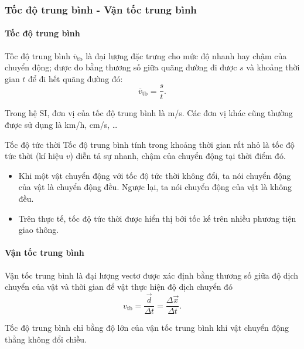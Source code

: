 \begin{tomtat}
	\subsubsection{Tốc độ trung bình - Vận tốc trung bình}
	\paragraph{Tốc độ trung bình}
	\begin{dn}
		Tốc độ trung bình $\overline{v}_{\text{tb}}$ là đại lượng đặc trưng cho mức độ nhanh hay chậm của chuyển động; được đo bằng thương số giữa quãng đường đi được $s$ và khoảng thời gian $t$ để đi hết quãng đường đó:
		\begin{equation}
			\overline{v}_{\text{tb}}=\dfrac{s}{t}.
		\end{equation}
	\end{dn}
	Trong hệ SI, đơn vị của tốc độ trung bình là \si{\meter/\second}. Các đơn vị khác cũng thường được sử dụng là \si{\kilo\meter/\hour}, \si{\centi\meter/\second}, \dots
	\begin{noidung}{Tốc độ tức thời}
		Tốc độ trung bình tính trong khoảng thời gian rất nhỏ là tốc độ tức thời (kí hiệu $v$) diễn tả sự nhanh, chậm của chuyển động tại thời điểm đó.
	\end{noidung}
	\begin{luuy}
		\begin{itemize}
			\item Khi một vật chuyển động với tốc độ tức thời không đổi, ta nói chuyển động của vật là chuyển động đều. Ngược lại, ta nói chuyển động của vật là không đều.
			\item Trên thực tế, tốc độ tức thời được hiển thị bởi tốc kế trên nhiều phương tiện giao thông.
		\end{itemize}
	\end{luuy}
	\paragraph{Vận tốc trung bình}
	\begin{dn}
		Vận tốc trung bình là đại lượng vectơ được xác định bằng thương số giữa độ dịch chuyển của vật và thời gian để vật thực hiện độ dịch chuyển đó
		$$v_\text{tb}=\dfrac{\vec{d}}{\Delta t}=\dfrac{\Delta \vec{x}}{\Delta t}.$$
	\end{dn}
	\begin{luuy}
		Tốc độ trung bình chỉ bằng độ lớn của vận tốc trung bình khi vật chuyển động thẳng không đổi chiều.
	\end{luuy}

\end{tomtat}

